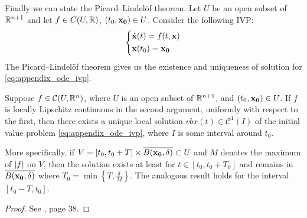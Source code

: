 Finally we can state the Picard--Lindelöf theorem. Let $U$ be an open subset of $\mathbb{R}^{n+1}$ and let $f \in C(U, \mathbb{R})$, $(t_0, \vb{x_0}) \in U$. Consider the following IVP:
\begin{equation} \label{eq:appendix_ode_ivp}
	\left\{
	\begin{aligned}
		&\dot{\vb{x}}(t) = f(t, \vb{x}) \\
		&\vb{x}(t_0) = \vb{x_0}
	\end{aligned}
	\right.
\end{equation}
The Picard--Lindelöf theorem gives us the existence and uniqueness of solution for \eqref{eq:appendix_ode_ivp}.

\begin{theorem} \label{teo:picard_lindelof}
	Suppose $f \in \mathcal{C}(U, \mathbb{R}^n)$, where $U$ is an open subset of $\mathbb{R}^{n+1}$, and $(t_0, \vb{x_0}) \in U$. If $f$ is locally Lipschitz continuous in the second argument, uniformly with respect to the first, then there exists a unique local solution $vb{x}(t) \in \mathcal{C}^1(I)$ of the initial value problem \eqref{eq:appendix_ode_ivp}, where $I$ is some interval around $t_0$. 
	
	More specifically, if $V = [t_0, t_0 + T] \times \overline{B(\vb{x_0}, \delta)} \subset U$ and $M$ denotes the maximum of $\abs{f}$ on $V$, then the solution exists at least for $t \in [t_0, t_0 + T_0]$ and remains in $\overline{B(\vb{x_0}, \delta)}$ where $T_0 = \min{\left\{ T, \frac{\delta}{M} \right\}}$. The analogous result holds for the interval $[t_0 - T, t_0]$.
\end{theorem}
\begin{proof}
	See \cite{teschl2012odes}, page 38.
\end{proof}